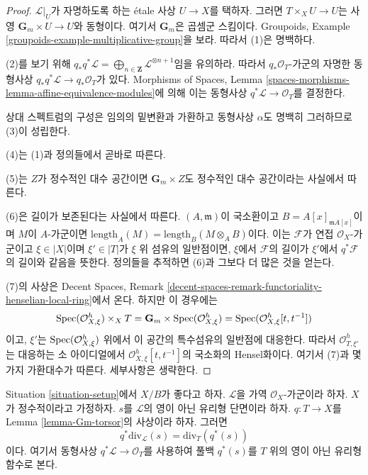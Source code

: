\begin{proof}
$\mathcal{L}|_U$가 자명하도록 하는 \'etale 사상 $U \to X$를
택하자. 그러면 $T \times_X U \to U$는 사영
$\mathbf{G}_m \times U \to U$와 동형이다. 여기서
$\mathbf{G}_m$은 곱셈군 스킴이다. Groupoids, Example
\ref{groupoids-example-multiplicative-group}을 보라. 따라서 (1)은
명백하다.

\medskip\noindent
(2)를 보기 위해
$q_*q^*\mathcal{L} =
\bigoplus_{n \in \mathbf{Z}} \mathcal{L}^{\otimes n + 1}$임을 유의하라.
따라서 $q_*\mathcal{O}_T$-가군의 자명한 동형사상
$q_*q^*\mathcal{L} \to q_*\mathcal{O}_T$가 있다.
Morphisms of Spaces, Lemma
\ref{spaces-morphisms-lemma-affine-equivalence-modules}에 의해 이는
동형사상 $q^*\mathcal{L} \to \mathcal{O}_T$를 결정한다.

\medskip\noindent
상대 스펙트럼의 구성은 임의의 밑변환과 가환하고 동형사상
$\alpha$도 명백히 그러하므로 (3)이 성립한다.

\medskip\noindent
(4)는 (1)과 정의들에서 곧바로 따른다.

\medskip\noindent
(5)는 $Z$가 정수적인 대수 공간이면
$\mathbf{G}_m \times Z$도 정수적인 대수 공간이라는 사실에서 따른다.

\medskip\noindent
(6)은 길이가 보존된다는 사실에서 따른다.
$(A, \mathfrak m)$이 국소환이고
$B = A[x]_{\mathfrak m A[x]}$이며 $M$이 $A$-가군이면
$\text{length}_A(M) = \text{length}_B(M \otimes_A B)$이다.
이는 $\mathcal{F}$가 연접 $\mathcal{O}_X$-가군이고
$\xi \in |X|$이며 $\xi' \in |T|$가 $\xi$ 위 섬유의 일반점이면,
$\xi$에서 $\mathcal{F}$의 길이가 $\xi'$에서
$q^*\mathcal{F}$의 길이와 같음을 뜻한다. 정의들을 추적하면
(6)과 그보다 더 많은 것을 얻는다.

\medskip\noindent
(7)의 사상은 Decent Spaces, Remark
\ref{decent-spaces-remark-functoriality-henselian-local-ring}에서 온다.
하지만 이 경우에는
$$
\mathop{\mathrm{Spec}}(\mathcal{O}_{X, \xi}^h) \times_X T =
\mathbf{G}_m \times \mathop{\mathrm{Spec}}(\mathcal{O}_{X, \xi}^h) =
\mathop{\mathrm{Spec}}(\mathcal{O}_{X, \xi}^h[t, t^{-1}])
$$
이고, $\xi'$는 $\mathop{\mathrm{Spec}}(\mathcal{O}_{X, \xi}^h)$ 위에서 이 공간의
특수섬유의 일반점에 대응한다. 따라서
$\mathcal{O}_{T, \xi'}^h$는 대응하는 소 아이디얼에서
$\mathcal{O}_{X, \xi}^h[t, t^{-1}]$의 국소화의 Hensel화이다.
여기서 (7)과 몇 가지 가환대수가 따른다. 세부사항은 생략한다.
\end{proof}

\begin{lemma}
\label{lemma-Gm-torsor-divisor-meromorphic-section}
Situation \ref{situation-setup}에서 $X/B$가 좋다고 하자.
$\mathcal{L}$을 가역 $\mathcal{O}_X$-가군이라 하자.
$X$가 정수적이라고 가정하자. $s$를 $\mathcal{L}$의 영이 아닌
유리형 단면이라 하자. $q : T \to X$를 Lemma
\ref{lemma-Gm-torsor}의 사상이라 하자. 그러면
$$
q^*\text{div}_\mathcal{L}(s) = \text{div}_T(q^*(s))
$$
이다. 여기서 동형사상 $q^*\mathcal{L} \to \mathcal{O}_T$를 사용하여
풀백 $q^*(s)$를 $T$ 위의 영이 아닌 유리형 함수로 본다.
\end{lemma}

